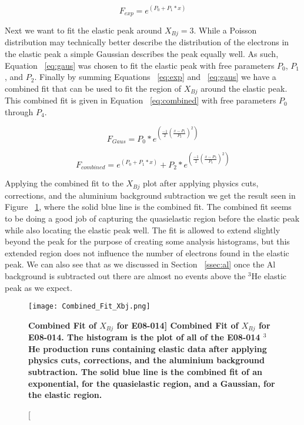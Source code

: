 \begin{equation} \label{eq:exp}
	F_{exp} = e^{\left( P_0+P_1*x \right)}
\end{equation}

Next we want to fit the elastic peak around $X_{Bj}=3$. While a Poisson distribution may technically better describe the distribution of the electrons in the elastic peak a simple Gaussian describes the peak equally well. As such, Equation ~\ref{eq:gaus} was chosen to fit the elastic peak with free parameters $P_0$, $P_1$, and $P_2$. Finally by summing Equations ~\ref{eq:exp} and ~\ref{eq:gaus} we have a combined fit that can be used to fit the region of $X_{Bj}$ around the elastic peak. This combined fit is given in Equation ~\ref{eq:combined} with free parameters $P_0$ through $P_4$.

\begin{equation} \label{eq:gaus}
	F_{Gaus} = P_0 * e^{\left( \frac{-1}{2} \left( \frac{x-P_1}{P_2} \right)^2 \right)}
\end{equation}

\begin{equation} \label{eq:combined}
	F_{combined} = e^{\left( P_0+P_1*x \right)} + P_2 * e^{\left( \frac{-1}{2} \left( \frac{x-P_3}{P_4} \right)^2 \right)}
\end{equation}

Applying the combined fit to the $X_{Bj}$ plot after applying physics cuts, corrections, and the aluminium background subtraction we get the result seen in Figure ~\ref{fig:combined}, where the solid blue line is the combined fit. The combined fit seems to be doing a good job of capturing the quasielastic region before the elastic peak while also locating the elastic peak well. The fit is allowed to extend slightly beyond the peak for the purpose of creating some analysis histograms, but this extended region does not influence the number of electrons found in the elastic peak. We can also see that as we discussed in Section ~\ref{ssec:al} once the Al background is subtracted out there are almost no events above the $^3$He elastic peak as we expect. 

\begin{figure}[!ht]
\begin{center}
\texttt{[image: Combined\_Fit\_Xbj.png]}
\end{center}
\caption[\bf{Combined Fit of $X_{Bj}$ for E08-014}]{
{\bf{Combined Fit of $X_{Bj}$ for E08-014.}} The histogram is the plot of all of the E08-014 $^3$He production runs containing elastic data after applying physics cuts, corrections, and the aluminium background subtraction. The solid blue line is the combined fit of an exponential, for the quasielastic region, and a Gaussian, for the elastic region.}
\label{fig:combined}
\end{figure}

